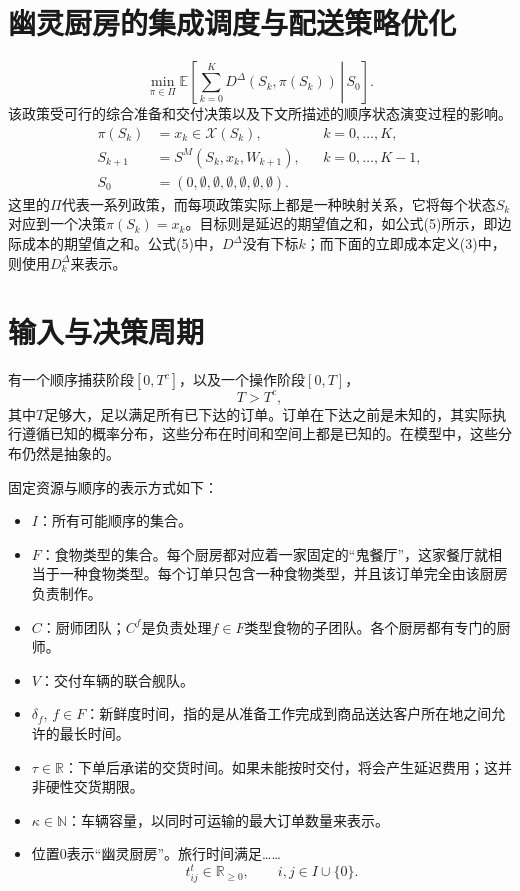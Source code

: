 \documentclass{article}
\begin{document}
\section*{幽灵厨房的集成调度与配送策略优化}

\begin{equation}
\min_{\pi\in\Pi}\mathbb{E}\left[\left.\sum_{k=0}^{K}D^{\Delta}(S_k,\pi(S_k))\,\right|\,S_0\right].
\tag{5}
\end{equation}
该政策受可行的综合准备和交付决策以及下文所描述的顺序状态演变过程的影响。
\begin{align*}
\pi(S_k)&=x_k\in\mathcal{X}(S_k), &&k=0,\ldots,K,\\
S_{k+1}&=S^M(S_k,x_k,W_{k+1}), &&k=0,\ldots,K-1,\\
S_0&=(0,\emptyset,\emptyset,\emptyset,\emptyset,\emptyset,\emptyset).
\end{align*}
这里的\(\Pi\)代表一系列政策，而每项政策实际上都是一种映射关系，它将每个状态\(S_k\)对应到一个决策\(\pi(S_k)=x_k\)。目标则是延迟的期望值之和，如公式(5)所示，即边际成本的期望值之和。公式(5)中，\(D^\Delta\)没有下标\(k\)；而下面的立即成本定义(3)中，则使用\(D_k^\Delta\)来表示。

\section*{输入与决策周期}

有一个顺序捕获阶段\([0,T^c]\)，以及一个操作阶段\([0,T]\)，
\[
T>T^c,
\]
其中\(T\)足够大，足以满足所有已下达的订单。订单在下达之前是未知的，其实际执行遵循已知的概率分布，这些分布在时间和空间上都是已知的。在模型中，这些分布仍然是抽象的。

固定资源与顺序的表示方式如下：
\begin{itemize}
\item \(I\)：所有可能顺序的集合。
\item \(F\)：食物类型的集合。每个厨房都对应着一家固定的“鬼餐厅”，这家餐厅就相当于一种食物类型。每个订单只包含一种食物类型，并且该订单完全由该厨房负责制作。
\item \(C\)：厨师团队；\(C^f\)是负责处理\(f\in F\)类型食物的子团队。各个厨房都有专门的厨师。
\item \(V\)：交付车辆的联合舰队。
\item \(\delta_f\), \(f\in F\)：新鲜度时间，指的是从准备工作完成到商品送达客户所在地之间允许的最长时间。
\item \(\tau\in\mathbb{R}\)：下单后承诺的交货时间。如果未能按时交付，将会产生延迟费用；这并非硬性交货期限。
\item \(\kappa\in\mathbb{N}\)：车辆容量，以同时可运输的最大订单数量来表示。
\item 位置\(0\)表示“幽灵厨房”。旅行时间满足……
\[
t^t_{ij}\in\mathbb{R}_{\geq 0},\qquad i,j\in I\cup\{0\}.
\]
\end{itemize}
\end{document}
